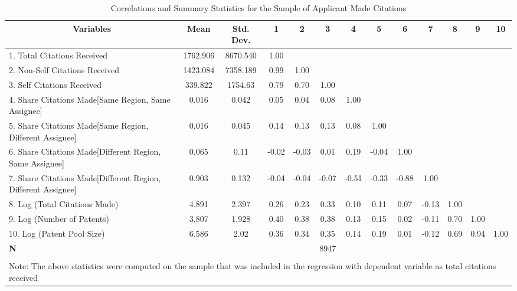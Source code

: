 \begin{sidewaystable}[htbp]\centering \caption{Correlations and Summary Statistics for the Sample of Applicant Made Citations \label{a.tcorrelation}}
\footnotesize
\onehalfspacing
\begin{tabular}{l  c  c  c  c  c  c  c  c  c  c  c  c }\hline\hline
\multicolumn{1}{c}{Variables} & \textbf{Mean}& \textbf{Std. Dev.}&1&2&3&4&5&6&7&8&9&10\\ \hline
1. Total Citations Received& 1762.906 & 8670.540&1.00\\
2. Non-Self Citations Received& 1423.084 & 7358.189&0.99&1.00\\
3. Self Citations Received& 339.822 & 1754.63&0.79&0.70&1.00\\
4. Share Citations Made[Same Region, Same Assignee] & 0.016 & 0.042&0.05&0.04&0.08&1.00\\
5. Share Citations Made[Same Region, Different Assignee]& 0.016 & 0.045&0.14&0.13&0.13&0.08&1.00\\
6. Share Citations Made[Different Region, Same Assignee]& 0.065 & 0.11&-0.02&-0.03&0.01&0.19&-0.04&1.00\\
7. Share Citations Made[Different Region, Different Assignee]& 0.903 & 0.132&-0.04&-0.04&-0.07&-0.51&-0.33&-0.88&1.00\\
8. Log (Total Citations Made)& 4.891 & 2.397&0.26&0.23&0.33&0.10&0.11&0.07&-0.13&1.00\\
9. Log (Number of Patents)& 3.807 & 1.928&0.40&0.38&0.38&0.13&0.15&0.02&-0.11&0.70&1.00\\
10. Log (Patent Pool Size)& 6.586 & 2.02&0.36&0.34&0.35&0.14&0.19&0.01&-0.12&0.69&0.94&1.00\\
\hline
\textbf{N}&&&&&8947\\
\hline \hline \\
\multicolumn{13}{l}{\footnotesize Note: The above statistics were computed on the sample that was included in the regression with dependent variable as total citations received}\\
 \end{tabular}
\end{sidewaystable}
